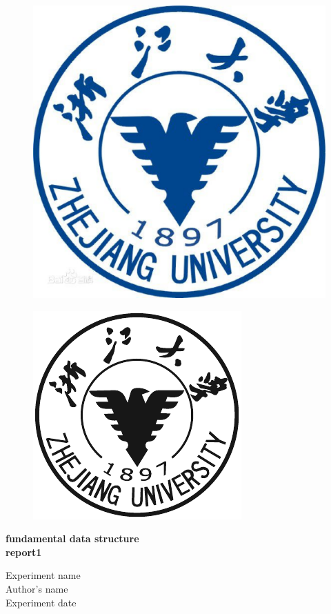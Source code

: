 \documentclass{article}
\begin{document}
\begin{titlepage}
        \vspace*{-3cm}
	
	\begin{figure}[h]
		\centering
		\includegraphics[width=0.7\linewidth]{zjdx}
	\end{figure}

	\vspace*{0.5cm}
	\begin{figure}[h]
		\centering
		\includegraphics[width=0.5\linewidth]{QSY}
	\end{figure}
	\vspace{-0.5cm}
	\begin{center}
		\Huge{\textbf{fundamental data structure}}\\
		
		\Huge{\textbf{report1}}
	\end{center}
	
	\vspace*{0.5cm}


	\vspace*{1cm}
    \begin{center}
            \Large 
            Experiment name\ \ \underline{} \\ 
            \Large 
            Author's name\ \ \underline{} \\ 
            \Large 
            Experiment date\ \ \underline{} \\ 
    \end{center}
        
    
\end{titlepage}
\end{document}
